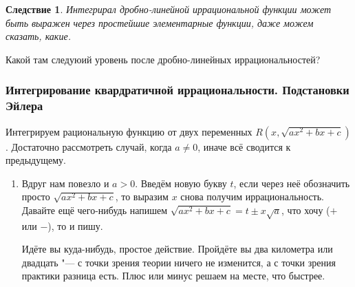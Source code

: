 \documentclass[a4paper,10pt,twoside]{article}
\newtheorem{Sl}{Следствие}[section]
\begin{document}
 \begin{Sl}
 	Интегрирал дробно-линейной иррациональной функции может быть  выражен через простейшие элементарные функции, даже можем сказать, какие.
 \end{Sl}
 
 Какой там следуюий уровень после дробно-линейных иррациональностей?
 
 \subsubsection{Интегрирование квардратичной иррациональности. Подстановки Эйлера}
 Интегрируем рациональную функцию от двух переменных $R(x,\sqrt{ax^2+bx+c})$. Достаточно рассмотреть случай, когда $a\neq0$, иначе всё сводится к предыдущему.
 
 \begin{enumerate}
   \item\label{E1} Вдруг нам повезло и $a>0$. Введём новую букву $t$, если через неё обозначить просто $\sqrt{ax^2+bx+c}$, то выразим $x$ снова получим
   иррациональность. Давайте ещё чего-нибудь напишем $\sqrt{ax^2+bx+c}=t\pm x\sqrt{a}$, что хочу ($+$ или $-$), то и пишу.
   
   Идёте вы куда-нибудь, простое действие. Пройдёте вы два километра или двадцать "--- с точки зрения теории ничего не изменится, а с точки зрения практики
   разница есть. Плюс или минус решаем на месте, что быстрее.
   

\end{enumerate}
\end{document}
